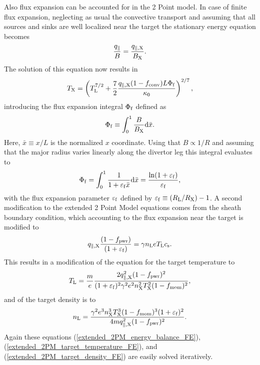 \documentclass[amsmath,amssymb,a4]{revtex4-2}
\begin{document}
Also flux expansion can be accounted for in the 2 Point model. In case of finite flux expansion, neglecting as usual the convective transport and assuming that all sources and sinks are well localized near the target the stationary energy equation becomes
\begin{equation}
    {q_\parallel \over B} = {q_{\parallel, \rm X} \over B_{\rm X}}.
\end{equation}
The solution of this equation now results in
\begin{equation}\label{extended_2PM_energy_balance_FE}
    T_{\rm X} = \left(T_{\rm L}^{7/2} + {7 \over 2} {q_{\parallel,\rm X} (1 - f_{\rm conv}) L  \Phi_{\rm f} \over \kappa_0}\right)^{2/7},
\end{equation}
introducing the flux expansion integral $\Phi_{\rm f}$ defined as
\begin{equation}\label{FE_integral}
    \Phi_{\rm f} \equiv \int_0^1 {B\over B_{\rm X}} {\rm d}{\bar x}.
\end{equation}
Here, ${\bar x} \equiv x /L$ is the normalized $x$ coordinate. Using that $B \propto 1/R$ and assuming that the major radius varies linearly along the divertor leg this integral evaluates to
\begin{equation}\label{FE_integral_}
    \Phi_{\rm f} = \int_0^1 {1 \over 1 + \varepsilon_{\rm f} {\bar x}} {\rm d}{\bar x} = {\ln( 1 + \varepsilon_{\rm f} ) \over \varepsilon_{\rm f}},
\end{equation}
with the flux expansion parameter $\varepsilon_{\rm f}$ defined by $\varepsilon_{\rm f} \equiv (R_{\rm L}/R_{\rm X}) - 1$. A second modification to the extended 2 Point Model equations comes from the sheath boundary condition, which accounting to the flux expansion near the target is modified to
\begin{equation}\label{2PM_sheath_heat_transmission_FE}
    q_{\parallel,\rm X} {(1-f_{\rm pwr}) \over (1 + \varepsilon_{\rm f})} = \gamma n_{\rm L} e T_{\rm L} c_{\rm s}.
\end{equation}
This results in a modification of the equation for the target temperature to
\begin{equation}\label{extended_2PM_target_temperature_FE}
    T_{\rm L} = {m \over e} {2 q_{\parallel,\rm X}^2 (1-f_{\rm pwr})^2 \over (1 + \varepsilon_{\rm f})^2 \gamma^2 e^2 n_{\rm X}^2 T_{\rm X}^2 (1-f_{\rm mom})^2},
\end{equation}
and of the target density is to
\begin{equation}\label{extended_2PM_target_density_FE}
    n_{\rm L} = {\gamma^2 e^3 n_{\rm X}^3 T_{\rm X}^3 (1-f_{\rm mom})^3 (1 + \varepsilon_{\rm f})^2 \over 4 m q_{\parallel,\rm X}^2 (1-f_{\rm pwr})^2}.
\end{equation}
Again these equations (\ref{extended_2PM_energy_balance_FE}), (\ref{extended_2PM_target_temperature_FE}), and (\ref{extended_2PM_target_density_FE}) are easily solved iteratively.
\end{document}
